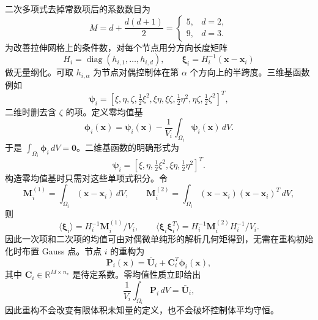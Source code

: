 \documentclass[
  12pt,
  UTF8]{ctexart}
\begin{document}
二次多项式去掉常数项后的系数数目为 \begin{equation}
M=d+\frac{d(d+1)}2=
\begin{cases}
5,&d=2,\\
9,&d=3.
\end{cases}\end{equation} 为改善拉伸网格上的条件数，对每个节点用分方向长度矩阵 \begin{equation}
H_i=\operatorname{diag}(h_{i,1},\ldots,h_{i,d}),\qquad
\boldsymbol\xi_i=H_i^{-1}(\boldsymbol x-\boldsymbol x_i)\end{equation} 做无量纲化。可取 \(h_{i,\alpha}\) 为节点对偶控制体在第 \(\alpha\)
个方向上的半跨度。三维基函数例如 \begin{equation}
\boldsymbol\psi_i=
\left[\xi,\eta,\zeta,
\tfrac12\xi^2,\xi\eta,\xi\zeta,
\tfrac12\eta^2,\eta\zeta,\tfrac12\zeta^2\right]^T,\end{equation} 二维时删去含 \(\zeta\) 的项。定义零均值基 \begin{equation}
\boldsymbol\phi_i(\boldsymbol x)=
\boldsymbol\psi_i(\boldsymbol x)-
\frac{1}{V_i}\int_{\Omega_i}\boldsymbol\psi_i(\boldsymbol x)\,dV.\end{equation} 于是
\(\int_{\Omega_i}\boldsymbol\phi_i\,dV=\boldsymbol 0\)。二维基函数的明确形式为
\begin{equation}
\boldsymbol\psi_i=[\xi,\eta,\tfrac12\xi^2,\xi\eta,\tfrac12\eta^2]^T.\end{equation} 构造零均值基时只需对这些单项式积分。令 \begin{equation}
\boldsymbol M_i^{(1)}=\int_{\Omega_i}(\boldsymbol x-\boldsymbol x_i)\,dV,\qquad
\boldsymbol M_i^{(2)}=\int_{\Omega_i}(\boldsymbol x-\boldsymbol x_i)
(\boldsymbol x-\boldsymbol x_i)^T\,dV,\end{equation} 则 \begin{equation}
\langle\boldsymbol\xi_i\rangle=H_i^{-1}\boldsymbol M_i^{(1)}/V_i,\qquad
\langle\boldsymbol\xi_i\boldsymbol\xi_i^T\rangle=
H_i^{-1}\boldsymbol M_i^{(2)}H_i^{-1}/V_i.\end{equation}
因此一次项和二次项的均值可由对偶微单纯形的解析几何矩得到，无需在重构初始化时布置
Gauss 点。节点 \(i\) 的重构为 \begin{equation}
\boxed{\boldsymbol P_i(\boldsymbol x)=\bar{\boldsymbol U}_i+
\boldsymbol C_i^T\boldsymbol\phi_i(\boldsymbol x)},\end{equation} 其中 \(\boldsymbol C_i\in\mathbb R^{M\times n_v}\)
是待定系数。零均值性质立即给出 \begin{equation}
\frac{1}{V_i}\int_{\Omega_i}\boldsymbol P_i\,dV=\bar{\boldsymbol U}_i,\end{equation} 因此重构不会改变有限体积未知量的定义，也不会破坏控制体平均守恒。
\end{document}
